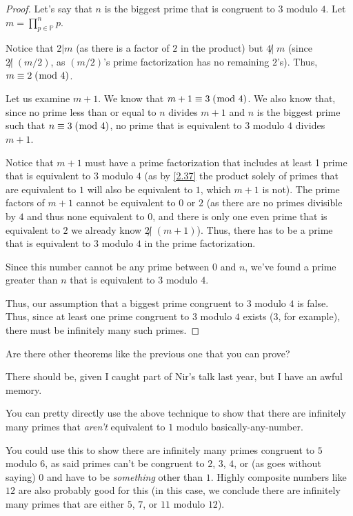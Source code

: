 \documentclass[../main.tex]{subfiles}
\begin{document}
\begin{proof}
  Let's say that $n$ is the biggest prime that is congruent to $3$ modulo $4$. Let $m = \prod_{p \in \mathbb{P}}^{n} p$.

  Notice that $2 | m$ (as there is a factor of $2$ in the product) but $4 \not | \; m$ (since $2 \not | \; (m/2)$, as $(m/2)$'s prime factorization has no remaining $2$'s). Thus, $m \equiv 2 \; (\bmod \; 4)$.

  Let us examine $m+1$. We know that $m + 1 \equiv 3 \; (\bmod \; 4)$. We also know that, since no prime less than or equal to $n$ divides $m+1$ and $n$ is the biggest prime such that $n \equiv 3 \; (\bmod \; 4)$, no prime that is equivalent to $3$ modulo $4$ divides $m+1$.

  Notice that $m+1$ must have a prime factorization that includes at least 1 prime that is equivalent to $3$ modulo $4$ (as by \ref{2.37} the product solely of primes that are equivalent to $1$ will also be equivalent to $1$, which $m+1$ is not). The prime factors of $m+1$ cannot be equivalent to $0$ or $2$ (as there are no primes divisible by $4$ and thus none equivalent to $0$, and there is only one even prime that is equivalent to $2$ we already know $2 \not | \; (m+1)$). Thus, there has to be a prime that is equivalent to $3$ modulo $4$ in the prime factorization.


  Since this number cannot be any prime between $0$ and $n$, we've found a prime greater than $n$ that is equivalent to $3$ modulo $4$.

  Thus, our assumption that a biggest prime congruent to $3$ modulo $4$ is false. Thus, since at least one prime congruent to $3$ modulo $4$ exists ($3$, for example), there must be infinitely many such primes.
\end{proof}



\pagebreak



\begin{ques} \label{2.39}
  Are there other theorems like the previous one that you can prove?
\end{ques}

There should be, given I caught part of Nir's talk last year, but I have an awful memory.

You can pretty directly use the above technique to show that there are infinitely many primes that \emph{aren't} equivalent to $1$ modulo basically-any-number.

You could use this to show there are infinitely many primes congruent to $5$ modulo $6$, as said primes can't be congruent to $2$, $3$, $4$, or (as goes without saying) $0$ and have to be \emph{something} other than $1$. Highly composite numbers like $12$ are also probably good for this (in this case, we conclude there are infinitely many primes that are either $5$, $7$, or $11$ modulo $12$).
\end{document}
